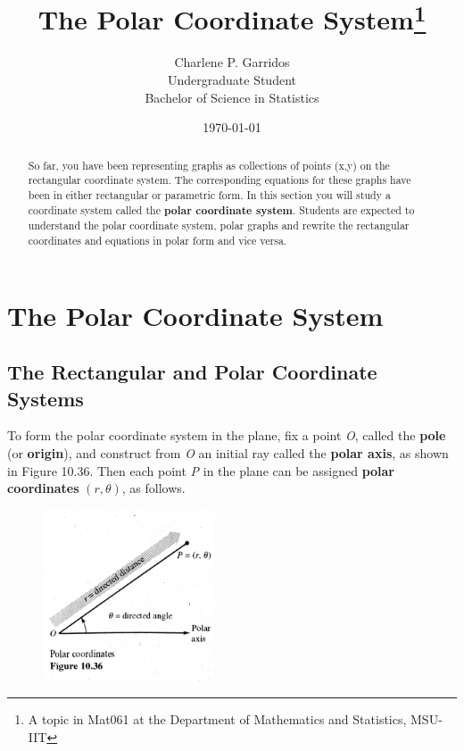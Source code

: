 \documentclass[12pt,twoside]{article}
\begin{document}
\title{The Polar Coordinate System\footnote{A topic in Mat061 at the Department of Mathematics and Statistics, MSU-IIT}}
\author{{\sffamily Charlene P. Garridos}\\
Undergraduate Student\\Bachelor of Science in Statistics}
\date{\today}
\maketitle
\tableofcontents
\begin{abstract}
So far, you have been representing graphs as collections of points (x,y) on the rectangular coordinate system. The corresponding equations for these graphs have been in either rectangular or parametric form. In this section you will study a coordinate system called the \textbf{polar coordinate system}. Students are expected to understand the polar coordinate system, polar graphs and rewrite the rectangular coordinates and equations in polar form and vice versa.
\end{abstract}
\section{The Polar Coordinate System}

\subsection{The Rectangular and Polar Coordinate Systems}

To form the polar coordinate system in the plane, fix a point \emph O, called the \textbf{pole} (or \textbf{origin}), and construct from \emph O an initial ray called the \textbf{polar axis}, as shown in Figure 10.36. Then each point \emph P in the plane can be assigned \textbf {polar coordinates} $ (r, \theta)$, as follows.

\begin{figure}[h]
\centering
\includegraphics[height=2in]{Figure 10.36.png}
\end{figure}
\end{document}
